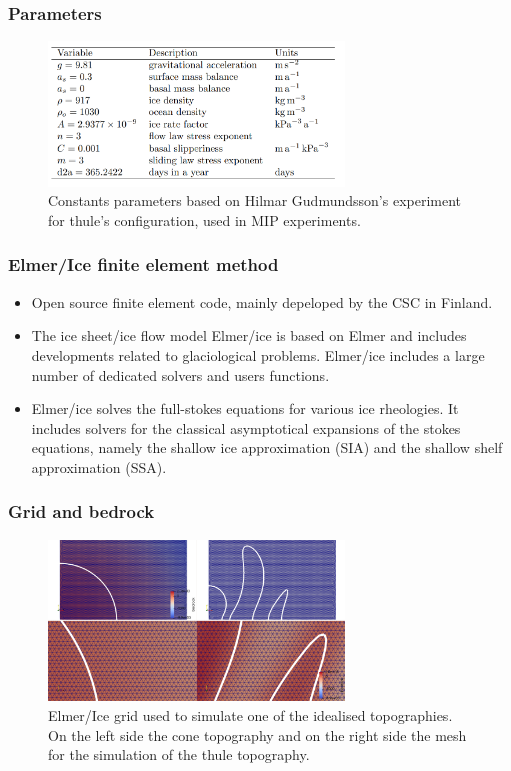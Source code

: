 \documentclass[11pt]{beamer}
\begin{document}
\begin{frame}
	\frametitle{Parameters}
	\begin{center}
		\begin{figure}[!h]
			\includegraphics[width=0.7\textwidth]{../fig/Constants_parameters.png} %
			\caption{\footnotesize Constants parameters based on Hilmar Gudmundsson's experiment for thule's configuration, used in MIP experiments. }
		\end{figure}
	\end{center}
\end{frame}
\begin{frame}
	\frametitle{Elmer/Ice finite element method}
\begin{itemize}
	\item 	Open source finite element code, mainly depeloped by the CSC in Finland. 
	\item The ice sheet/ice flow model Elmer/ice is based on Elmer and includes developments related to glaciological problems. Elmer/ice includes a large number of dedicated solvers and users functions.
	\item 	Elmer/ice solves the full-stokes equations for various ice rheologies. 
	It includes solvers for the classical asymptotical expansions of the stokes equations, namely the shallow 	ice approximation (SIA) and the shallow shelf approximation (SSA).
\end{itemize}
\end{frame}
\begin{frame}
	\frametitle{Grid and bedrock}
		\begin{center}
		\begin{figure}[!h]
			\includegraphics[width=0.7\textwidth]{../fig/grid_and_bedrock.png} %
			\caption{\footnotesize Elmer/Ice grid used to simulate one of the idealised topographies. On the left side the cone topography and on the right side the mesh for the simulation of the thule topography. }
		\end{figure}
	\end{center}
\end{frame}
\end{document}
